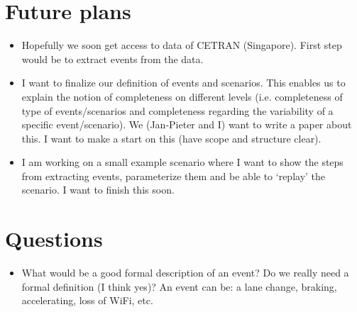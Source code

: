 \documentclass[10pt,final,a4paper,oneside,onecolumn]{article}
\begin{document}
\section*{Future plans}
\begin{itemize}
	\item Hopefully we soon get access to data of CETRAN (Singapore). First step would be to extract events from the data.
	\item I want to finalize our definition of events and scenarios. This enables us to explain the notion of completeness on different levels (i.e. completeness of type of events/scenarios and completeness regarding the variability of a specific event/scenario). We (Jan-Pieter and I) want to write a paper about this. I want to make a start on this (have scope and structure clear).
	\item I am working on a small example scenario where I want to show the steps from extracting events, parameterize them and be able to `replay' the scenario. I want to finish this soon.
\end{itemize}

\section*{Questions}
\begin{itemize}
	\item What would be a good formal description of an event? Do we really need a formal definition (I think yes)? An event can be: a lane change, braking, accelerating, loss of WiFi, etc.
\end{itemize}



\end{document}

